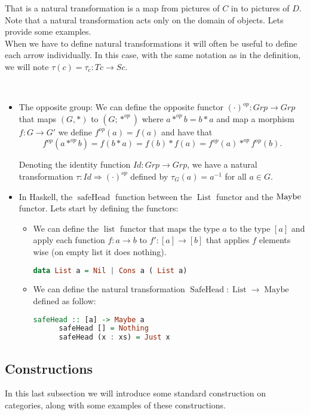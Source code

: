   That is a natural transformation is a map from pictures of $C$ in to pictures of $D$. Note that a natural transformation acts only on the domain of objects. Lets provide some examples.\\

When we have to define natural transformations  it will often be useful to define each arrow individually. In this case, with the same notation as in the definition,  we will note $\tau(c) = \tau_c: Tc \to Sc$. 

  \begin{example}\ 
    \begin{itemize}
    \item The opposite group: We can define the opposite functor $(\cdot)^{op}: Grp \to Grp$ that maps $(G, *)$ to $(G; *^{op})$ where $a*^{op}b= b*a$ and map a morphism $f: G \to G'$ we define $f^{op}(a) = f(a)$ and have that
      $$ f^{op}(a*^{op}b) = f(b*a) = f(b)*f(a) = f^{op}(a) *^{op} f^{op}(b).$$

Denoting the identity function $Id:Grp\to Grp$, we have a natural transformation $\tau:Id \Rightarrow (\cdot)^{op}$ defined by $\tau_G(a)=a^{-1}$ for all $a\in G$.
\item In Haskell, the $\operatorname{safeHead}$ \cite[Section 10.1]{milewski2018category} function between the $\operatorname{List}$ functor and the $\operatorname{Maybe}$ functor. Lets start by defining the functors:
  \begin{itemize}
  \item We can define the $\operatorname{list}$ functor that maps the type $a$ to the type $[a]$ and apply each function $f:a\to b$ to $f':[a]\to [b]$ that applies $f$ elements wise (on empty list it does nothing).
    \begin{lstlisting}[language=Haskell,captionpos=b]
    data List a = Nil | Cons a ( List a)
    \end{lstlisting}
  \item  We can define the natural transformation $\operatorname{SafeHead}: \operatorname{List} \to \operatorname{Maybe}$ defined as follow:
    \begin{lstlisting}[language=Haskell,captionpos=b]
      safeHead :: [a] -> Maybe a
      safeHead [] = Nothing
      safeHead (x : xs) = Just x
    \end{lstlisting}
  \end{itemize}
    \end{itemize}
  \end{example}

  
\subsection{Constructions}
In this last subsection we will introduce some standard construction on categories, along with some examples of these constructions.


